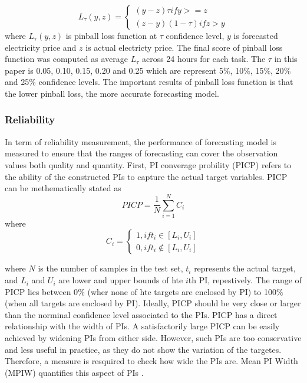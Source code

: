 \documentclass[review]{elsarticle}
\begin{document}
        \begin{equation}
          L_{\tau}(y,z) =
          \begin{cases}
            (y-z)\tau if y>=z \\
            (z-y)(1-\tau) if z>y
          \end{cases}
          \label{eq.pinball}
        \end{equation}
        where $L_{\tau}(y,z)$ is pinball loss function at $\tau$ confidence level, $y$ is forecasted electricity price and $z$ is actual electricty price.
        The final score of pinball loss function was computed as average $L_{\tau}$ across 24 hours for each task.
        The $\tau$ in this paper is 0.05, 0.10, 0.15, 0.20 and 0.25 which are represent 5$\%$, 10$\%$, 15$\%$, 20$\%$ and 25$\%$ confidence levels.
        The important results of pinball loss function is that the lower pinball loss, the more accurate forecasting model.

      \subsubsection{Reliability}
        In term of reliability measurement, the performance of forecasting model is measured to ensure that the ranges of forecasting can cover the observation values both quality and quantity.
        First,  PI converage probility (PICP) refers to the ability of the constructed PIs to capture the actual target variables.
        PICP can be methematically stated as
        \begin{equation}
          PICP = \frac{1}{N} \sum_{i=1}^{N} C_{i}
          \label{eq.PICP}
        \end{equation}
        where
        \begin{equation}
          C_{i} =
          \begin{cases}
            1, if t_{i} \in [L_{i},U_{i}] \\
            0, if t_{i} \not\in [L_{i},U_{i}]
          \end{cases}
          \label{eq.Ci}
        \end{equation}

        where $N$ is the number of samples in the test set, $t_{i}$ represents the actual target, and $L_{i}$ and $U_{i}$ are lower and upper bounds of hte $i$th PI, repestively.
        The range of PICP lies between 0$\%$ (wher none of hte targets are enclosed by PI) to 100$\%$ (when all targets are enclosed by PI).
        Ideally, PICP should be very close or larger than the norminal confidence level associated to the PIs.
        PICP has a direct relationship with the width of PIs.
        A satisfactorily large PICP can be easily achieved by widening PIs from either side.
        However, such PIs are too conservative and less useful in practice, as they do not show the variation of the targetes.
        Therefore, a measure is resquired to check how wide the PIs are.
        Mean PI Width (MPIW) quantifies this aspect of PIs \cite{Khosravi2010}.
\end{document}
